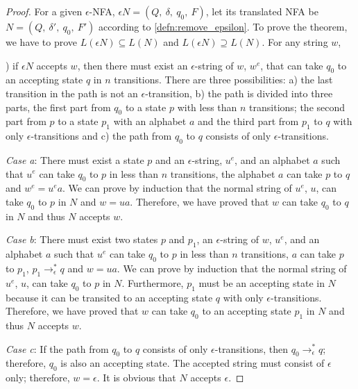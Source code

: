 \begin{proof}
\noindent For a given \(\epsilon\)-NFA, \(\epsilon N = (Q,\ \delta,\ q_0,\
F)\), let its translated NFA be \(N = (Q,\ \delta',\ q_0,\ F')\)
according to \autoref{defn:remove_epsilon}. To
prove the theorem, we have to prove \(L(\epsilon N) \subseteq
L(N)\) and \(L(\epsilon N) \supseteq L(N)\). For any string \(w\), 

\par {}) if \(\epsilon N\) accepts \(w\), then there must exist an
\(\epsilon\)-string of \(w\), \(w^e\), that can take \(q_0\) to an
accepting state \(q\) in \(n\) transitions. There are three
possibilities: a) the last transition in the path is not an
\(\epsilon\)-transition, b) the path is divided into three parts, the
first part from \(q_0\) to a state \(p\) with less than \(n\)
transitions; the second part from \(p\) to a state \(p_1\) with an
alphabet \(a\) and the third part from \(p_1\) to \(q\) with only
\(\epsilon\)-transitions and c) the path from \(q_0\)
to \(q\) consists of only \(\epsilon\)-transitions.

\par \textit{Case a}: There must exist a state \(p\) and an
\(\epsilon\)-string, \(u^e\), and an alphabet \(a\) such that \(u^e\)
can take \(q_0\) to \(p\) in less than \(n\) transitions, the alphabet
\(a\) can take \(p\) to \(q\) and \(w^e = u^ea\). We can prove by
induction that the normal string of \(u^e\), \(u\), can take
\(q_0\) to \(p\) in \(N\) and \(w = ua\). Therefore, we have proved that \(w\) can
take \(q_0\) to \(q\) in \(N\) and thus \(N\) accepts \(w\). 

\par \textit{Case b}: There must exist two states \(p\) and \(p_1\), an
\(\epsilon\)-string of \(w\), \(u^e\), and an alphabet \(a\) such
that \(u^e\) can take \(q_0\) to \(p\) in less than \(n\) transitions,
\(a\) can take \(p\) to \(p_1\), \(p_1 \to_\epsilon^* q\) and \(w = ua\). We can prove by
induction that the normal string of \(u^e\), \(u\), can take \(q_0\) to \(p\) in
\(N\). Furthermore, \(p_1\) must be an accepting state in \(N\)
because it can be transited to an accepting state \(q\) with only
\(\epsilon\)-transitions. Therefore, we have proved that \(w\) can take \(q_0\) to an
accepting state \(p_1\) in \(N\) and thus \(N\) accepts \(w\). 

\par \textit{Case c}: If the path from \(q_0\)
to \(q\) consists of only \(\epsilon\)-transitions, then \(q_0
\to_\epsilon^* q\); therefore, \(q_0\) is also an accepting
state. The accepted string must consist of \(\epsilon\) only;
therefore, \(w = \epsilon\). It is obvious that \(N\) accepts
\(\epsilon\). 


\end{proof}
